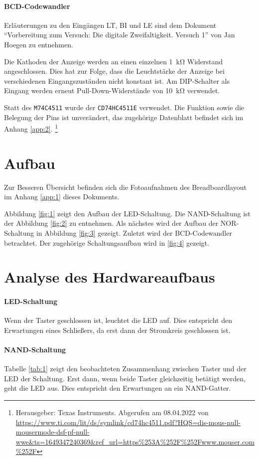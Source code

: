 \documentclass[
    paper=a4,
]{scrartcl}
\begin{document}
    \paragraph{BCD-Codewandler}
        Erläuterungen zu den Eingängen LT, BI und LE sind dem Dokument "`Vorbereitung zum Versuch: Die digitale Zweifaltigkeit. Versuch 1"' von Jan Hoegen zu entnehmen. 
        
        Die Kathoden der Anzeige werden an einen einzelnen \SI{1}{\kilo\ohm} Widerstand angeschlossen. Dies hat zur Folge, dass die Leuchtstärke der Anzeige bei verschiedenen Eingangszuständen nicht konstant ist. Am DIP-Schalter als Eingang werden erneut Pull-Down-Widerstände von \SI{10}{\kilo\ohm} verwendet.

        Statt des \texttt{M74C4511} wurde der \texttt{CD74HC4511E} verwendet. Die Funktion sowie die Belegung der Pins ist unverändert, das zugehörige Datenblatt befindet sich im Anhang \ref{app:2}.%
        \footnote{Herausgeber: Texas Instruments. Abgerufen am 08.04.2022 von \url{https://www.ti.com/lit/ds/symlink/cd74hc4511.pdf?HQS=dis-mous-null-mousermode-dsf-pf-null-wwe&ts=1649347240369&ref_url=https\%253A\%252F\%252Fwww.mouser.com\%252F}}

\section{Aufbau}
    Zur Besseren Übersicht befinden sich die Fotoaufnahmen des Breadboardlayout im Anhang \ref{app:1} dieses Dokuments.

    Abbildung \ref{fig:1} zeigt den Aufbau der LED-Schaltung. Die NAND-Schaltung ist der Abbildung \ref{fig:2} zu entnehmen. Als nächstes wird der Aufbau der NOR-Schaltung in Abbildung \ref{fig:3} gezeigt. Zuletzt wird der BCD-Codewandler betrachtet. Der zugehörige Schaltungsaufbau wird in \ref{fig:4} gezeigt. 

\section{Analyse des Hardwareaufbaus}
    \paragraph{LED-Schaltung} Wenn der Taster geschlossen ist, leuchtet die LED auf. Dies entspricht den Erwartungen eines Schließers, da erst dann der Stromkreis geschlossen ist.

    \paragraph{NAND-Schaltung} Tabelle \ref{tab:1} zeigt den beobachteten Zusammenhang zwischen Taster und der LED der Schaltung. Erst dann, wenn beide Taster gleichzeitig betätigt werden, geht die LED aus. Dies entspricht den Erwartungen an ein NAND-Gatter.
\end{document}
